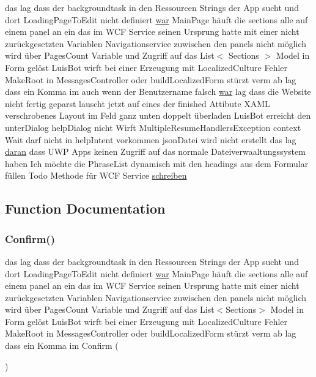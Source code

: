 \begin{DoxyCompactItemize}
das lag dass der backgroundtask in den Ressourcen Strings der App sucht und dort Loading\+Page\+To\+Edit nicht definiert \mbox{\hyperlink{_r_e_a_d_m_e_8txt_a2a72fc7da943588cba8c302409b22e53}{war}} Main\+Page häuft die sections alle auf einem panel an ein das im W\+CF Service seinen Ursprung hatte mit einer nicht zurückgesetzten Variablen Navigationservice zuwischen den panels nicht möglich wird über Pages\+Count Variable und Zugriff auf das List$<$ Sections $>$ Model in Form gelöst Luis\+Bot wirft bei einer Erzeugung mit Localized\+Culture Fehler Make\+Root in Messages\+Controller oder build\+Localized\+Form stürzt verm ab lag dass ein Komma im auch wenn der Benutzername falsch \mbox{\hyperlink{_r_e_a_d_m_e_8txt_a2a72fc7da943588cba8c302409b22e53}{war}} lag dass die Website nicht fertig geparst lauscht jetzt auf eines der finished Attibute X\+A\+ML verschrobenes Layout im Feld ganz unten doppelt überladen Luis\+Bot erreicht den unter\+Dialog help\+Dialog nicht Wirft Multiple\+Resume\+Handlers\+Exception context Wait darf nicht in help\+Intent vorkommen json\+Datei wird nicht erstellt das lag \mbox{\hyperlink{_r_e_a_d_m_e_8txt_a135543df2f8a787ac2ddeaf87194562c}{daran}} dass U\+WP Apps keinen Zugriff auf das normale Dateiverwaaltungssystem haben Ich möchte die Phrase\+List dynamisch mit den headings aus dem Formular füllen Todo Methode für W\+CF Service \mbox{\hyperlink{_r_e_a_d_m_e_8txt_a7cfea504e3a5e9a3a42e1f0a414a9efa}{schreiben}}
\end{DoxyCompactItemize}


\subsection{Function Documentation}
\mbox{\label{_r_e_a_d_m_e_8txt_a3f0b43af3dec73858a3eea661590145f}} 
\subsubsection{\texorpdfstring{Confirm()}{Confirm()}}
{\footnotesize\ttfamily das lag dass der backgroundtask in den Ressourcen Strings der App sucht und dort Loading\+Page\+To\+Edit nicht definiert \mbox{\hyperlink{_r_e_a_d_m_e_8txt_a2a72fc7da943588cba8c302409b22e53}{war}} Main\+Page häuft die sections alle auf einem panel an ein das im W\+CF Service seinen Ursprung hatte mit einer nicht zurückgesetzten Variablen Navigationservice zuwischen den panels nicht möglich wird über Pages\+Count Variable und Zugriff auf das List$<$Sections$>$ Model in Form gelöst Luis\+Bot wirft bei einer Erzeugung mit Localized\+Culture Fehler Make\+Root in Messages\+Controller oder build\+Localized\+Form stürzt verm ab lag dass ein Komma im Confirm (\begin{DoxyParamCaption}{ }\end{DoxyParamCaption})}

